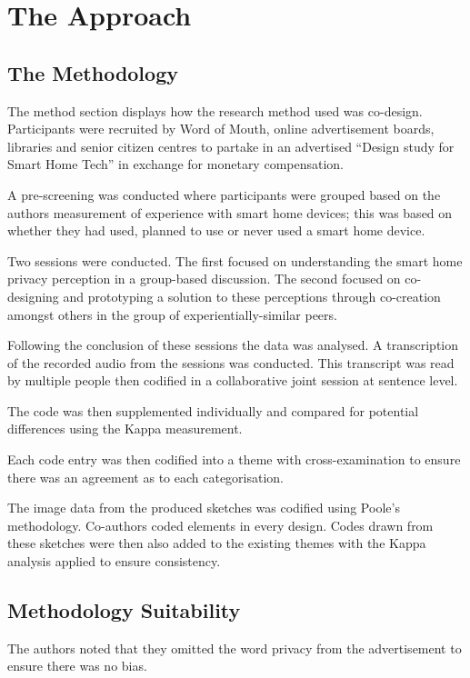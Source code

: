 \section{The Approach}

\subsection{The Methodology}

The method section displays how the research method used was co-design. Participants were recruited by Word of Mouth, online advertisement boards, libraries and senior citizen centres to partake in an advertised ``Design study for Smart Home Tech'' in exchange for monetary compensation. 

A pre-screening was conducted where participants were grouped based on the authors measurement of experience with smart home devices; this was based on whether they had used, planned to use or never used a smart home device.

Two sessions were conducted. The first focused on understanding the smart home privacy perception in a group-based discussion. The second focused on co-designing and prototyping a solution to these perceptions through co-creation amongst others in the group of experientially-similar peers. 

Following the conclusion of these sessions the data was analysed. A transcription of the recorded audio from the sessions was conducted. This transcript was read by multiple people then codified in a collaborative joint session at sentence level. 

The code was then supplemented individually and compared for potential differences using the Kappa measurement. 

Each code entry was then codified into a theme with cross-examination to ensure there was an agreement as to each categorisation.

The image data from the produced sketches was codified using Poole's methodology. Co-authors coded elements in every design. 
Codes drawn from these sketches were then also added to the existing themes with the Kappa analysis applied to ensure consistency. 

\subsection{Methodology Suitability}

The authors noted that they omitted the word privacy from the advertisement to ensure there was no bias.

